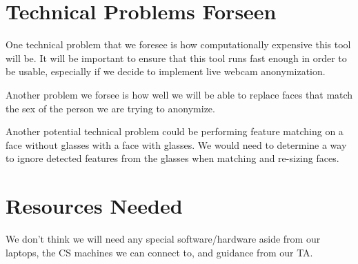 \section*{Technical Problems Forseen}

One technical problem that we foresee is how computationally expensive this tool will be. It will be important to ensure that this tool runs fast enough in order to be usable, especially if we decide to implement live webcam anonymization.

Another problem we forsee is how well we will be able to replace faces that match the sex of the person we are trying to anonymize.

Another potential technical problem could be performing feature matching on a face without glasses with a face with glasses. We would need to determine a way to ignore detected features from the glasses when matching and re-sizing faces.

\section*{Resources Needed}

We don't think we will need any special software/hardware aside from our laptops, the CS machines we can connect to, and guidance from our TA.


